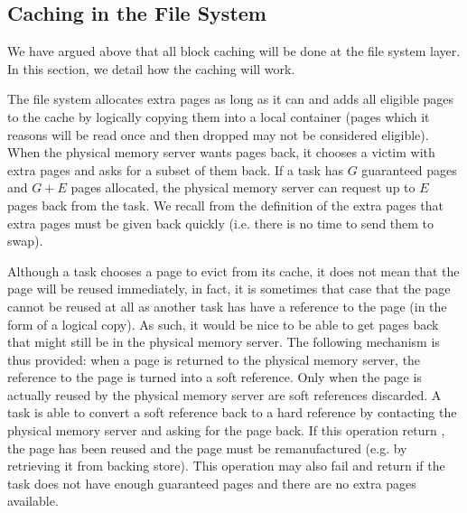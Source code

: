 \subsection{Caching in the File System}

We have argued above that all block caching will be done at the file
system layer.  In this section, we detail how the caching will work.

The file system allocates extra pages as long as it can and adds all
eligible pages to the cache by logically copying them into a local
container (pages which it reasons will be read once and then dropped
may not be considered eligible).  When the physical memory server
wants pages back, it chooses a victim with extra pages and asks for a
subset of them back.  If a task has $G$ guaranteed pages and $G + E$
pages allocated, the physical memory server can request up to $E$
pages back from the task.  We recall from the definition of the extra
pages that extra pages must be given back quickly (i.e. there is no
time to send them to swap).

Although a task chooses a page to evict from its cache, it does not
mean that the page will be reused immediately, in fact, it is
sometimes that case that the page cannot be reused at all as another
task has have a reference to the page (in the form of a logical copy).
As such, it would be nice to be able to get pages back that might
still be in the physical memory server.  The following mechanism is
thus provided: when a page is returned to the physical memory server,
the reference to the page is turned into a soft reference.  Only when
the page is actually reused by the physical memory server are soft
references discarded.  A task is able to convert a soft reference back
to a hard reference by contacting the physical memory server and
asking for the page back.  If this operation return ,
the page has been reused and the page must be remanufactured (e.g. by
retrieving it from backing store).  This operation may also fail and
return  if the task does not have enough guaranteed
pages and there are no extra pages available.

\begin{comment}
There is a problem here in the form of name space pollution: the task
doing the caching has to remember the mapping of blocks to container
identifiers in order to recover the soft reference but the task has no
way to know when the physical memory server expires a given soft
reference.  Thus, while the physical memory server may drop a page,
the task will only ever know this when it tries to convert the soft
reference to a hard reference and fails (i.e. gets a cache miss).  For
pages which this is never done, the memorized mapping will never be
invalidated.  This may not be a problem if a block offset to container
id is used, however, if hashing is done or some other mapping of block
offsets to container identifiers is used, this will pollute the cache
container's name space.
\end{comment}

